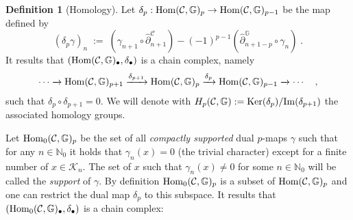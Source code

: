 \documentclass[a4paper,12pt,twoside,reqno]{amsart}
\theoremstyle{plain}
\theoremstyle{definition}
\newtheorem{definition}[teo]{Definition}
\theoremstyle{remark}
\numberwithin{equation}{section}
\numberwithin{figure}{section}
\numberwithin{table}{section}
\newcommand{\f}[1]{\mathcal{#1}}
\newcommand{\n}[1]{\mathbb{#1}}
\begin{document}
	
	
	
	
	
	
	
	\begin{definition}[Homology]\label{def:delta_p map}
		Let  $\delta_{p}:{\rm Hom}(\f{C},\n{G})_{p}\to {\rm Hom}(\f{C},\n{G})_{p-1}$ be the map defined by
		\begin{equation*}
			(\delta_p\gamma)_n\;:=\;(\gamma_{n+1}\circ \widehat{\partial}_{n+1}^\f{C}) -(-1)^{p-1} (\widehat{\partial}^\n{G}_{n+1-p}\circ \gamma_n)\;.
		\end{equation*}
		It results that $( {\rm Hom}(\f{C},\n{G})_\bullet  , \delta_\bullet )$ is a chain complex, namely
		\begin{align}\label{chain complex}
			\cdots \xrightarrow{} {\rm Hom}(\f{C},\n{G})_{p+1} \xrightarrow{\delta_{p+1}} {\rm Hom}(\f{C},\n{G})_{p} \xrightarrow{\delta_{p}} {\rm Hom}(\f{C},\n{G})_{p-1} \xrightarrow{} \cdots \quad ,
		\end{align}
		such that $\delta_{p} \circ \delta_{p+1}=0$. We will denote with 
		$H_p(\f{C},\n{G}):={\rm Ker}({\delta_p})/{\rm Im}({\delta_{p+1}})$	
		the associated homology groups.
	\end{definition}
	
	
	
	
	
	
	
	
	
	
	
	
	
	\medskip
	
	
	
	
	
	
	
	
	
	
	
	
	
	
	
	
	
	
	
	Let ${\rm Hom}_0(\f{C},\n{G})_{p}$ be the set of all \emph{compactly supported} dual $p$-maps $\gamma$ such that for any $n\in\n{N}_0$ it holds that $\gamma_n(x)=0$ (the trivial character) except for a finite number of $x\in \f{K}_n$. The set of $x$ 
	such that $\gamma_n(x)\neq 0$ for some $n\in\n{N}_0$ will be called the \emph{support} of $\gamma$.
	By definition ${\rm Hom}_0(\f{C},\n{G})_{p}$ is a subset of ${\rm Hom}(\f{C},\n{G})_{p}$ and one can restrict the dual map $\delta_p$ to this subspace. It results that 
	$( {\rm Hom}_0(\f{C},\n{G})_{\bullet}  , \delta_\bullet )$ is a chain complex:
	
\end{document}

